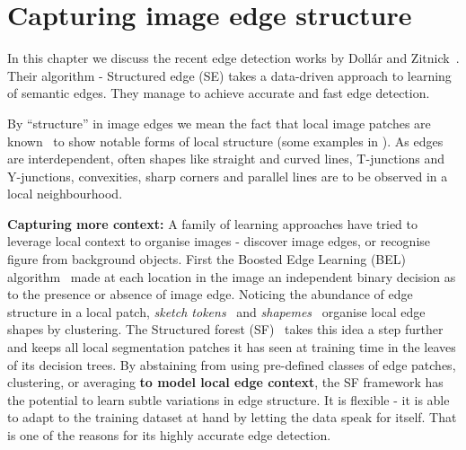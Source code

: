 \chapter{Capturing image edge structure} %
\label{Chapter2}
In this chapter we discuss the recent edge detection works by Doll\'ar and Zitnick~\cite{DollarICCV13edges,Dollar2015PAMI}. Their algorithm - Structured edge (SE) takes a data-driven approach to learning of semantic edges. %
They manage to achieve accurate and fast edge detection. %

By ``structure'' in image edges %
we mean the fact that local image patches are known~\cite{Ren2006figure,LimZD13} to show %
notable %
forms of local structure (some examples in ). As edges are interdependent, often shapes like straight and curved lines, T-junctions and Y-junctions, convexities, sharp corners and parallel lines are to be observed in a local neighbourhood.

\textbf{Capturing more context:} A family of learning approaches have tried to leverage local context to organise images - discover image edges, or recognise %
figure from background objects. First the Boosted Edge Learning (BEL) algorithm~\cite{dollar2006supervised} made at each location in the image an independent binary decision as to the presence or absence of image edge. Noticing the abundance of edge structure in a local patch, \textit{sketch tokens}~\cite{LimZD13} and \textit{shapemes}~\cite{Ren2006figure} organise local edge shapes by clustering. 
The Structured forest (SF)~\cite{DollarICCV13edges} takes this idea a step further and keeps all local segmentation patches it has seen at training time in the leaves of its decision trees. By abstaining from using pre-defined classes of edge patches, clustering, or averaging \textbf{to model local edge context}, the SF framework has the potential to learn subtle variations in edge structure. It is flexible - it is able to adapt to the training dataset at hand by letting the data speak for itself. That is one of the reasons for its highly accurate edge detection.


